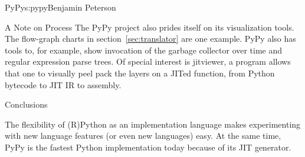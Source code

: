 \begin{aosachapter}{PyPy}{s:pypy}{Benjamin Peterson}
\begin{aosasect1}{A Note on Process}
The PyPy project also prides itself on its visualization tools. The flow-graph
charts in section~\ref{sec:translator} are one example. PyPy also has tools to,
for example, show invocation of the garbage collector over time and regular
expression parse trees. Of special interest is jitviewer, a program allows that
one to visually peel pack the layers on a JITed function, from Python bytecode
to JIT IR to assembly.

\end{aosasect1}

\begin{aosasect1}{Conclusions}

The flexibility of (R)Python as an implementation language makes experimenting
with new language features (or even new languages) easy. At the same time, PyPy
is the fastest Python implementation today because of its JIT generator.

\end{aosasect1}

\end{aosachapter}
